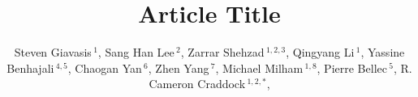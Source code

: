 \documentclass{frontiersSCNS} %
\def\firstAuthorLast{Giavasis {et~al.}} %
\def\Authors{Steven Giavasis\,$^{1}$,
        Sang Han Lee\,$^{2}$,
        Zarrar Shehzad\,$^{1,2,3}$,
        Qingyang Li\,$^{1}$,
        Yassine Benhajali\,$^{4,5}$,
        Chaogan Yan\,$^{6}$,
        Zhen Yang\,$^{7}$,
        Michael Milham\,$^{1,8}$,
        Pierre Bellec\,$^{5}$,
        R. Cameron Craddock\,$^{1,2,*}$,
}
\begin{document}
\onecolumn
{}

\title[Running Title]{Article Title} 

\author[\firstAuthorLast ]{\Authors} %
\address{} %
\correspondance{} %

\extraAuth{}%


\maketitle

\end{document}
